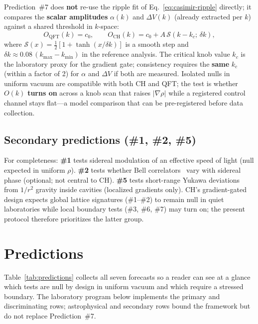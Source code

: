 \documentclass[11pt,a4paper]{article}
\begin{document}
Prediction~\#7 does \textbf{not} re-use the ripple fit of Eq.~\ref{eq:casimir-ripple} directly; it compares the \textbf{scalar amplitudes} $\alpha(k)$ and $\Delta V(k)$ (already extracted per $k$) against a shared threshold in $k$-space:
\begin{equation}
  O_{\mathrm{QFT}}(k) = c_0, \qquad
  O_{\mathrm{CH}}(k) = c_0 + A\,\mathcal{S}(k - k_c;\,\delta k),
  \label{eq:threshold-fit}
\end{equation}
where $\mathcal{S}(x) = \tfrac{1}{2}[1 + \tanh(x/\delta k)]$ is a smooth step and $\delta k \approx 0.08\,(k_{\max}-k_{\min})$ in the reference analysis.
The critical knob value $k_c$ is the laboratory proxy for the gradient gate; consistency requires the \textbf{same} $k_c$ (within a factor of 2) for $\alpha$ and $\Delta V$ if both are measured.
Isolated nulls in uniform vacuum are compatible with both CH and QFT; the test is whether $O(k)$ \textbf{turns on} across a knob scan that raises $|\nabla\rho|$ while a registered control channel stays flat---a model comparison that can be pre-registered before data collection.

\subsection{Secondary predictions (\#1, \#2, \#5)}

For completeness: \textbf{\#1} tests sidereal modulation of an effective speed of light (null expected in uniform $\rho$).
\textbf{\#2} tests whether Bell correlators~\cite{Bell1964,Einstein1935} vary with sidereal phase (optional; not central to CH).
\textbf{\#5} tests short-range Yukawa deviations from $1/r^2$ gravity inside cavities (localized gradients only).
CH's gradient-gated design expects global lattice signatures (\#1--\#2) to remain null in quiet laboratories while local boundary tests (\#3, \#6, \#7) may turn on; the present protocol therefore prioritizes the latter group.

\section{Predictions}
\label{sec:predictions}

Table~\ref{tab:predictions} collects all seven forecasts so a reader can see at a glance which tests are null by design in uniform vacuum and which require a stressed boundary.
The laboratory program below implements the primary and discriminating rows; astrophysical and secondary rows bound the framework but do not replace Prediction~\#7.
\end{document}

